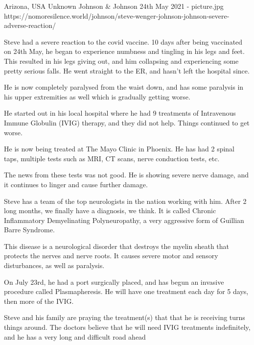 {Arizona, USA}
{Unknown}
{Johnson \& Johnson}
{24th May 2021}
{-}
{picture.jpg}
{https://nomoresilence.world/johnson/steve-wenger-johnson-johnson-severe-adverse-reaction/}
{

Steve had a severe reaction to the covid vaccine. 10 days after being vaccinated
on 24th May, he began to experience numbness and tingling in his legs and
feet. This resulted in his legs giving out, and him collapsing and experiencing
some pretty serious falls. He went straight to the ER, and hasn’t left the
hospital since.

He is now completely paralysed from the waist down, and has some paralysis in
his upper extremities as well which is gradually getting worse.

He started out in his local hospital where he had 9 treatments of Intravenous
Immune Globulin (IVIG) therapy, and they did not help. Things continued to get
worse.

He is now being treated at The Mayo Clinic in Phoenix. He has had 2 spinal taps,
multiple tests such as MRI, CT scans, nerve conduction tests, etc.

The news from these tests was not good. He is showing severe nerve damage, and
it continues to linger and cause further damage.

Steve has a team of the top neurologists in the nation working with him. After 2
long months, we finally have a diagnosis, we think. It is called Chronic
Inflammatory Demyelinating Polyneuropathy, a very aggressive form of Guillian
Barre Syndrome.

This disease is a neurological disorder that destroys the myelin sheath that
protects the nerves and nerve roots. It causes severe motor and sensory
disturbances, as well as paralysis.

On July 23rd, he had a port surgically placed, and has begun an invasive
procedure called Plasmapheresis. He will have one treatment each day for 5 days,
then more of the IVIG.

Steve and his family are praying the treatment(s) that that he is receiving
turns things around. The doctors believe that he will need IVIG treatments
indefinitely, and he has a very long and difficult road ahead

}
